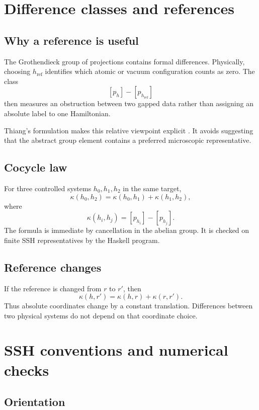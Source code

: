 \documentclass[12pt]{article}
\theoremstyle{definition}
\theoremstyle{remark}
\begin{document}
\section{Difference classes and references}

\subsection{Why a reference is useful}

The Grothendieck group of projections contains formal differences.
Physically, choosing $h_{\mathrm{ref}}$ identifies which atomic or vacuum
configuration counts as zero.
The class
\[
[p_h]-[p_{h_{\mathrm{ref}}}]
\]
then measures an obstruction between two gapped data rather than assigning an
absolute label to one Hamiltonian.

Thiang's formulation makes this relative viewpoint explicit
\cite{Thiang2016}.
It avoids suggesting that the abstract group element contains a preferred
microscopic representative.

\subsection{Cocycle law}

For three controlled systems $h_0,h_1,h_2$ in the same target,
\[
\kappa(h_0,h_2)
=
\kappa(h_0,h_1)+\kappa(h_1,h_2),
\]
where
\[
\kappa(h_i,h_j)=[p_{h_i}]-[p_{h_j}].
\]
The formula is immediate by cancellation in the abelian group.
It is checked on finite SSH representatives by the Haskell program.

\subsection{Reference changes}

If the reference is changed from $r$ to $r'$, then
\[
\kappa(h,r')
=
\kappa(h,r)+\kappa(r,r').
\]
Thus absolute coordinates change by a constant translation.
Differences between two physical systems do not depend on that coordinate
choice.

\section{SSH conventions and numerical checks}

\subsection{Orientation}
\end{document}
